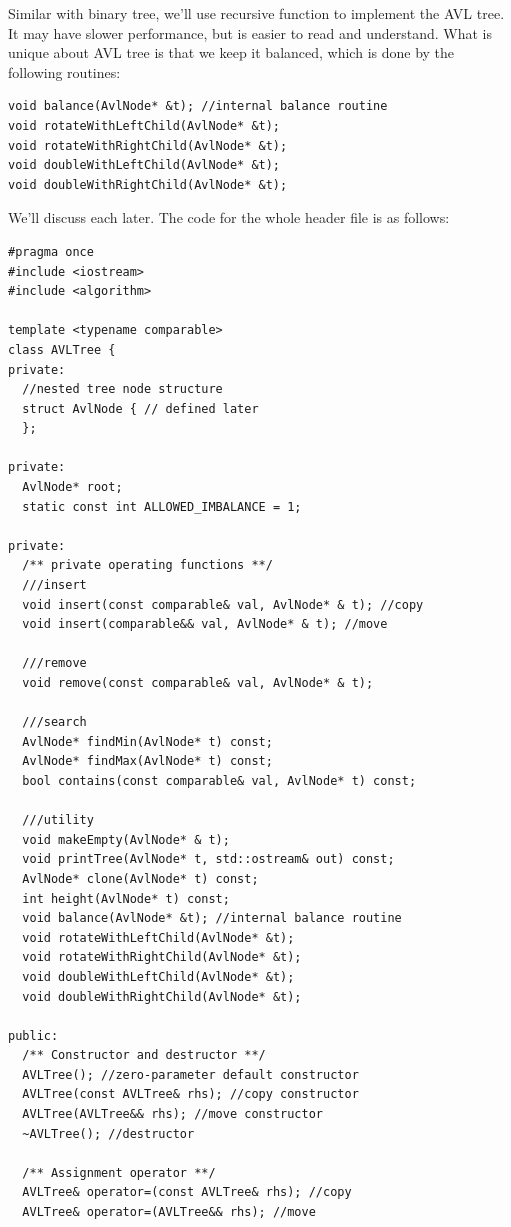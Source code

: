 \documentclass[11pt]{book}
\begin{document}
Similar with binary tree, we'll use recursive function to implement the AVL tree. It may have slower performance, but is easier to read and understand. What is unique about AVL tree is that we keep it balanced, which is done by the following routines:
\begin{verbatim}
void balance(AvlNode* &t); //internal balance routine
void rotateWithLeftChild(AvlNode* &t);
void rotateWithRightChild(AvlNode* &t);
void doubleWithLeftChild(AvlNode* &t);
void doubleWithRightChild(AvlNode* &t);
\end{verbatim}

We'll discuss each later. The code for the whole header file is as follows:
\begin{verbatim}
#pragma once
#include <iostream>
#include <algorithm>

template <typename comparable>
class AVLTree {
private:
  //nested tree node structure
  struct AvlNode { // defined later
  };

private:
  AvlNode* root;
  static const int ALLOWED_IMBALANCE = 1;

private:
  /** private operating functions **/
  ///insert 
  void insert(const comparable& val, AvlNode* & t); //copy
  void insert(comparable&& val, AvlNode* & t); //move

  ///remove
  void remove(const comparable& val, AvlNode* & t);

  ///search 
  AvlNode* findMin(AvlNode* t) const;
  AvlNode* findMax(AvlNode* t) const;
  bool contains(const comparable& val, AvlNode* t) const;

  ///utility
  void makeEmpty(AvlNode* & t);
  void printTree(AvlNode* t, std::ostream& out) const;
  AvlNode* clone(AvlNode* t) const;
  int height(AvlNode* t) const;
  void balance(AvlNode* &t); //internal balance routine
  void rotateWithLeftChild(AvlNode* &t);
  void rotateWithRightChild(AvlNode* &t);
  void doubleWithLeftChild(AvlNode* &t);
  void doubleWithRightChild(AvlNode* &t);

public:
  /** Constructor and destructor **/
  AVLTree(); //zero-parameter default constructor
  AVLTree(const AVLTree& rhs); //copy constructor
  AVLTree(AVLTree&& rhs); //move constructor
  ~AVLTree(); //destructor

  /** Assignment operator **/
  AVLTree& operator=(const AVLTree& rhs); //copy
  AVLTree& operator=(AVLTree&& rhs); //move


\end{verbatim}
\end{document}
